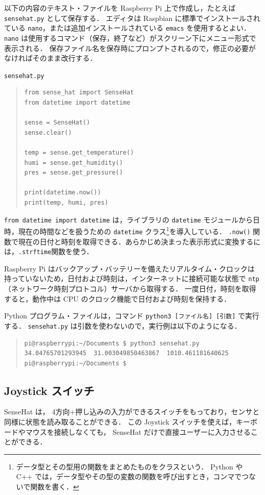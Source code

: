 \documentclass[11pt,a4,epsf]{article}
\begin{document}
以下の内容のテキスト・ファイルを Raspberry Pi 上で作成し，たとえば \verb+sensehat.py+ として保存する．
エディタは Raspbian に標準でインストールされている \verb+nano+，または追加インストールされている \verb+emacs+ を使用するとよい．
\verb+nano+ は使用するコマンド（保存，終了など）がスクリーン下にメニュー形式で表示される．
保存ファイル名を保存時にプロンプトされるので，修正の必要がなければそのまま改行する．
 \begin{itembox}[l]{\tt sensehat.py}
\begin{quote}
\small
\begin{verbatim}
from sense_hat import SenseHat
from datetime import datetime

sense = SenseHat()
sense.clear()

temp = sense.get_temperature()
humi = sense.get_humidity()
pres = sense.get_pressure()
    
print(datetime.now())
print(temp, humi, pres)
\end{verbatim}
\end{quote}
\end{itembox}
\verb+from datetime import datetime+ は，ライブラリの \verb+datetime+ モジュールから日時，現在の時間などを扱うための \verb+datetime+ クラス\footnote{データ型とその型用の関数をまとめたものをクラスという． Python や C++ では，データ型やその型の変数の関数を呼び出すとき，コンマでつないで関数を書く．}を導入している．
\verb+.now()+ 関数で現在の日付と時刻を取得できる．あらかじめ決まった表示形式に変換するには，\verb+.strftime+関数を使う．

Raspberry Pi はバックアップ・バッテリーを備えたリアルタイム・クロックは持っていないため，日付および時刻は，インターネットに接続可能な状態で \verb+ntp+ （ネットワーク時刻プロトコル）サーバから取得する．
一度日付，時刻を取得すると，動作中は CPU のクロック機能で日付および時刻を保持する．

Python プログラム・ファイルは，コマンド \verb+python3 [ファイル名] [引数]+ で実行する．
\verb+sensehat.py+ は引数を使わないので，実行例は以下のようになる．
\begin{quote}
\small
\begin{verbatim}
pi@raspberrypi:~/Documents $ python3 sensehat.py 
34.04765701293945  31.003049850463867  1010.461181640625 
pi@raspberrypi:~/Documents $ 
\end{verbatim}
\end{quote}

\subsection{Joystick スイッチ}
SenseHat は， 4方向+押し込みの入力ができるスイッチをもっており，センサと同様に状態を読み取ることができる．
この Joystick スイッチを使えば，キーボードやマウスを接続しなくても， SenseHat だけで直接ユーザーに入力させることができる．
\end{document}
